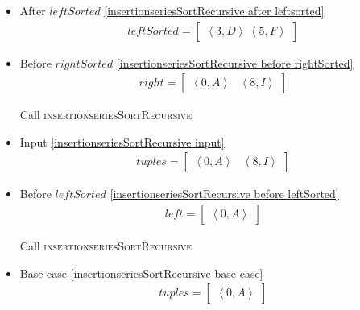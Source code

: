 \begin{frame}[containsverbatim]{\insertionseriesexampleframe}
\begin{columns}[c]
\begin{column}{0.6\textwidth}
{\begin{minipage}[c]{\textwidth}
\begin{multicols}{3}
\begin{itemize}
                                    \item After $leftSorted$ \cref{insertionseriesSortRecursive after leftsorted}
                                    \begin{align*}
                                        leftSorted = \begin{bmatrix}\left<3, D\right> \ \left<5, F\right>\end{bmatrix}
                                    \end{align*}
        
                                    \item Before $rightSorted$ \cref{insertionseriesSortRecursive before rightSorted}
                                    \begin{align*}
                                        right = \begin{bmatrix}\left<0, A\right> & \left<8, I\right>\end{bmatrix}
                                    \end{align*}
        
                                    Call \textsc{insertionseriesSortRecursive}
        
                                    \item Input \cref{insertionseriesSortRecursive input}
                                    \begin{align*}
                                        tuples = \begin{bmatrix}\left<0, A\right> & \left<8, I\right>\end{bmatrix}
                                    \end{align*}
        
                                    \item Before $leftSorted$ \cref{insertionseriesSortRecursive before leftSorted}
                                    \begin{align*}
                                        left = \begin{bmatrix}\left<0, A\right>\end{bmatrix}
                                    \end{align*}
        
                                    Call \textsc{insertionseriesSortRecursive}
        
                                    \item Base case \cref{insertionseriesSortRecursive base case}
                                    \begin{align*}
                                        tuples = \begin{bmatrix}\left<0, A\right>\end{bmatrix}
                                    \end{align*}
        

\end{itemize}
\end{multicols}
\end{minipage}}
\end{column}
\end{columns}
\end{frame}
